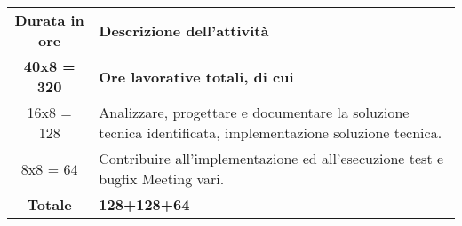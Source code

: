 

\begin{tabularx}{\textwidth}{|c|X|}
	\hline
	\textbf{Durata in ore} & \textbf{Descrizione dell'attività} \\
	\textbf{40x8 = 320} & \textbf{Ore lavorative totali, di cui} \\
	\hline
	16x8 = 128 & Analizzare, progettare e documentare la soluzione tecnica identificata, implementazione soluzione tecnica. \\
	\hline
	8x8 = 64 & Contribuire all’implementazione ed all’esecuzione test e bugfix Meeting vari.\\
	\hline
	\textbf{Totale} &\textbf{128+128+64}\\
	\hline
\end{tabularx}